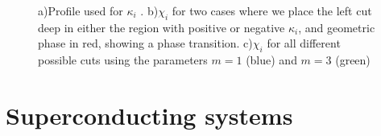 \documentclass[prb,twocolumn,amsmath,longbibliography,amssymb,superscriptaddress]{revtex4-1}
\begin{document}
\begin{figure}[h!]
\centering
{}\hspace{0mm}



\caption{a)Profile used for $\kappa_i$ . b)$\chi_i$ for two cases where we place the left cut deep in either the region with positive or negative $\kappa_i$, and geometric phase in red, showing a phase transition. c)$\chi_i$ for all different possible cuts using the parameters $m=1$ (blue) and $m=3$ (green)}
\label{cuts}
\end{figure}

\section{Superconducting systems}
\end{document}
